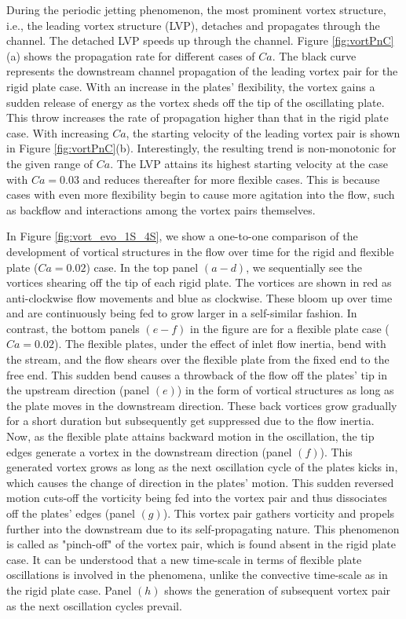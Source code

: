 \documentclass[final,3p,times,authoryear]{elsarticle}
\begin{document}
During the periodic jetting phenomenon, the most prominent vortex structure, i.e., the leading vortex structure (LVP), detaches and propagates through the channel. The detached LVP speeds up through the channel. 
Figure \ref{fig:vortPnC}(a) shows the propagation rate for different cases of $Ca$. The black curve represents the downstream channel propagation of the leading vortex pair for the rigid plate case. With an increase in the plates' flexibility, the vortex gains a sudden release of energy as the vortex sheds off the tip of the oscillating plate. This throw increases the rate of propagation higher than that in the rigid plate case. With increasing $Ca$, the starting velocity of the leading vortex pair is shown in Figure \ref{fig:vortPnC}(b). Interestingly, the resulting trend is non-monotonic for the given range of $Ca$. The LVP attains its highest starting velocity at the case with $Ca=0.03$ and reduces thereafter for more flexible cases. This is because cases with even more flexibility begin to cause more agitation into the flow, such as backflow and interactions among the vortex pairs themselves.


In Figure \ref{fig:vort_evo_1S_4S}, we show a one-to-one comparison of the development of vortical structures in the flow over time for the rigid and flexible plate ($Ca=0.02$) case. In the top panel $(a-d)$, we sequentially see the vortices shearing off the tip of each rigid plate. The vortices are shown in red as anti-clockwise flow movements and blue as clockwise. These bloom up over time and are continuously being fed to grow larger in a self-similar fashion. In contrast, the bottom panels $(e-f)$ in the figure are for a flexible plate case ($Ca=0.02$). The flexible plates, under the effect of inlet flow inertia, bend with the stream, and the flow shears over the flexible plate from the fixed end to the free end. This sudden bend causes a throwback of the flow off the plates' tip in the upstream direction (panel $(e)$) in the form of vortical structures as long as the plate moves in the downstream direction. These back vortices grow gradually for a short duration but subsequently get suppressed due to the flow inertia. Now, as the flexible plate attains backward motion in the oscillation, the tip edges generate a vortex in the downstream direction (panel $(f)$). This generated vortex grows as long as the next oscillation cycle of the plates kicks in, which causes the change of direction in the plates' motion. This sudden reversed motion cuts-off the vorticity being fed into the vortex pair and thus dissociates off the plates' edges (panel $(g)$). This vortex pair gathers vorticity and propels further into the downstream due to its self-propagating nature. This phenomenon is called as "pinch-off" of the vortex pair, which is found absent in the rigid plate case. It can be understood that a new time-scale in terms of flexible plate oscillations is involved in the phenomena, unlike the convective time-scale as in the rigid plate case. Panel $(h)$ shows the generation of subsequent vortex pair as the next oscillation cycles prevail.
\end{document}
